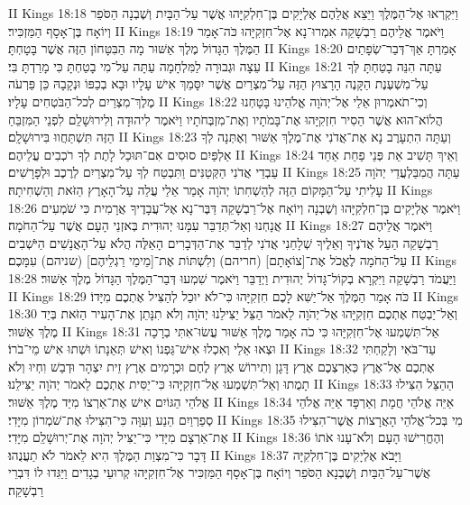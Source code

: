 II Kings 18:18	וַיִּקְרְאוּ אֶל־הַמֶּלֶךְ וַיֵּצֵא אֲלֵהֶם אֶלְיָקִים בֶּן־חִלְקִיָּהוּ אֲשֶׁר עַל־הַבָּיִת וְשֶׁבְנָה הַסֹּפֵר וְיוֹאָח בֶּן־אָסָף הַמַּזְכִּיר׃
II Kings 18:19	וַיֹּאמֶר אֲלֵיהֶם רַבְשָׁקֵה אִמְרוּ־נָא אֶל־חִזְקִיָּהוּ כֹּה־אָמַר הַמֶּלֶךְ הַגָּדוֹל מֶלֶךְ אַשּׁוּר מָה הַבִּטָּחוֹן הַזֶּה אֲשֶׁר בָּטָחְתָּ׃
II Kings 18:20	אָמַרְתָּ אַךְ־דְּבַר־שְׂפָתַיִם עֵצָה וּגְבוּרָה לַמִּלְחָמָה עַתָּה עַל־מִי בָטַחְתָּ כִּי מָרַדְתָּ בִּי׃
II Kings 18:21	עַתָּה הִנֵּה בָטַחְתָּ לְּךָ עַל־מִשְׁעֶנֶת הַקָּנֶה הָרָצוּץ הַזֶּה עַל־מִצְרַיִם אֲשֶׁר יִסָּמֵךְ אִישׁ עָלָיו וּבָא בְכַפּוֹ וּנְקָבָהּ כֵּן פַּרְעֹה מֶלֶךְ־מִצְרַיִם לְכל־הַבֹּטְחִים עָלָיו׃
II Kings 18:22	וְכִי־תֹאמְרוּן אֵלַי אֶל־יְהֹוָה אֱלֹהֵינוּ בָּטָחְנוּ הֲלוֹא־הוּא אֲשֶׁר הֵסִיר חִזְקִיָּהוּ אֶת־בָּמֹתָיו וְאֶת־מִזְבְּחֹתָיו וַיֹּאמֶר לִיהוּדָה וְלִירוּשָׁלַ͏ִם לִפְנֵי הַמִּזְבֵּחַ הַזֶּה תִּשְׁתַּחֲווּ בִּירוּשָׁלָ͏ִם׃
II Kings 18:23	וְעַתָּה הִתְעָרֶב נָא אֶת־אֲדֹנִי אֶת־מֶלֶךְ אַשּׁוּר וְאֶתְּנָה לְךָ אַלְפַּיִם סוּסִים אִם־תּוּכַל לָתֶת לְךָ רֹכְבִים עֲלֵיהֶם׃
II Kings 18:24	וְאֵיךְ תָּשִׁיב אֵת פְּנֵי פַחַת אַחַד עַבְדֵי אֲדֹנִי הַקְּטַנִּים וַתִּבְטַח לְךָ עַל־מִצְרַיִם לְרֶכֶב וּלְפָרָשִׁים׃
II Kings 18:25	עַתָּה הֲמִבַּלְעֲדֵי יְהֹוָה עָלִיתִי עַל־הַמָּקוֹם הַזֶּה לְהַשְׁחִתוֹ יְהֹוָה אָמַר אֵלַי עֲלֵה עַל־הָאָרֶץ הַזֹּאת וְהַשְׁחִיתָהּ׃
II Kings 18:26	וַיֹּאמֶר אֶלְיָקִים בֶּן־חִלְקִיָּהוּ וְשֶׁבְנָה וְיוֹאָח אֶל־רַבְשָׁקֵה דַּבֶּר־נָא אֶל־עֲבָדֶיךָ אֲרָמִית כִּי שֹׁמְעִים אֲנָחְנוּ וְאַל־תְּדַבֵּר עִמָּנוּ יְהוּדִית בְּאזְנֵי הָעָם אֲשֶׁר עַל־הַחֹמָה׃
II Kings 18:27	וַיֹּאמֶר אֲלֵיהֶם רַבְשָׁקֵה הַעַל אֲדֹנֶיךָ וְאֵלֶיךָ שְׁלָחַנִי אֲדֹנִי לְדַבֵּר אֶת־הַדְּבָרִים הָאֵלֶּה הֲלֹא עַל־הָאֲנָשִׁים הַיֹּשְׁבִים עַל־הַחֹמָה לֶאֱכֹל אֶת־[צוֹאָתָם] (חריהם) וְלִשְׁתּוֹת אֶת־[מֵימֵי רַגְלֵיהֶם] (שניהם) עִמָּכֶם׃
II Kings 18:28	וַיַּעֲמֹד רַבְשָׁקֵה וַיִּקְרָא בְקוֹל־גָּדוֹל יְהוּדִית וַיְדַבֵּר וַיֹּאמֶר שִׁמְעוּ דְּבַר־הַמֶּלֶךְ הַגָּדוֹל מֶלֶךְ אַשּׁוּר׃
II Kings 18:29	כֹּה אָמַר הַמֶּלֶךְ אַל־יַשִּׁא לָכֶם חִזְקִיָּהוּ כִּי־לֹא יוּכַל לְהַצִּיל אֶתְכֶם מִיָּדוֹ׃
II Kings 18:30	וְאַל־יַבְטַח אֶתְכֶם חִזְקִיָּהוּ אֶל־יְהֹוָה לֵאמֹר הַצֵּל יַצִּילֵנוּ יְהֹוָה וְלֹא תִנָּתֵן אֶת־הָעִיר הַזֹּאת בְּיַד מֶלֶךְ אַשּׁוּר׃
II Kings 18:31	אַל־תִּשְׁמְעוּ אֶל־חִזְקִיָּהוּ כִּי כֹה אָמַר מֶלֶךְ אַשּׁוּר עֲשׂוּ־אִתִּי בְרָכָה וּצְאוּ אֵלַי וְאִכְלוּ אִישׁ־גַּפְנוֹ וְאִישׁ תְּאֵנָתוֹ וּשְׁתוּ אִישׁ מֵי־בֹרוֹ׃
II Kings 18:32	עַד־בֹּאִי וְלָקַחְתִּי אֶתְכֶם אֶל־אֶרֶץ כְּאַרְצְכֶם אֶרֶץ דָּגָן וְתִירוֹשׁ אֶרֶץ לֶחֶם וּכְרָמִים אֶרֶץ זֵית יִצְהָר וּדְבַשׁ וִחְיוּ וְלֹא תָמֻתוּ וְאַל־תִּשְׁמְעוּ אֶל־חִזְקִיָּהוּ כִּי־יַסִּית אֶתְכֶם לֵאמֹר יְהֹוָה יַצִּילֵנוּ׃
II Kings 18:33	הַהַצֵּל הִצִּילוּ אֱלֹהֵי הַגּוֹיִם אִישׁ אֶת־אַרְצוֹ מִיַּד מֶלֶךְ אַשּׁוּר׃
II Kings 18:34	אַיֵּה אֱלֹהֵי חֲמָת וְאַרְפָּד אַיֵּה אֱלֹהֵי סְפַרְוַיִם הֵנַע וְעִוָּה כִּי־הִצִּילוּ אֶת־שֹׁמְרוֹן מִיָּדִי׃
II Kings 18:35	מִי בְּכל־אֱלֹהֵי הָאֲרָצוֹת אֲשֶׁר־הִצִּילוּ אֶת־אַרְצָם מִיָּדִי כִּי־יַצִּיל יְהֹוָה אֶת־יְרוּשָׁלַ͏ִם מִיָּדִי׃
II Kings 18:36	וְהֶחֱרִישׁוּ הָעָם וְלֹא־עָנוּ אֹתוֹ דָּבָר כִּי־מִצְוַת הַמֶּלֶךְ הִיא לֵאמֹר לֹא תַעֲנֻהוּ׃
II Kings 18:37	וַיָּבֹא אֶלְיָקִים בֶּן־חִלְקִיָּה אֲשֶׁר־עַל־הַבַּיִת וְשֶׁבְנָא הַסֹּפֵר וְיוֹאָח בֶּן־אָסָף הַמַּזְכִּיר אֶל־חִזְקִיָּהוּ קְרוּעֵי בְגָדִים וַיַּגִּדוּ לוֹ דִּבְרֵי רַבְשָׁקֵה׃
